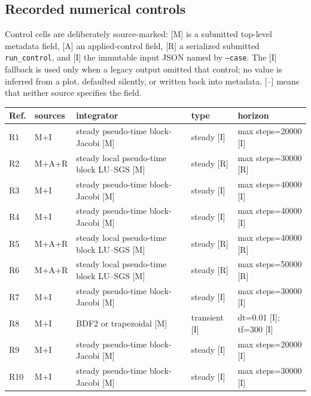 \subsection{Recorded numerical controls}
Control cells are deliberately source-marked: [M] is a submitted top-level metadata field, [A] an applied-control field, [R] a serialized submitted \texttt{run\_control}, and [I] the immutable input JSON named by \texttt{--case}. The [I] fallback is used only when a legacy output omitted that control; no value is inferred from a plot, defaulted silently, or written back into metadata. [--] means that neither source specifies the field.
\begin{center}\small
\begin{tabular}{llp{4.0cm}lp{3.4cm}}
\toprule Ref. & sources & integrator & type & horizon\\
\midrule
R1 & M+I & steady pseudo-time block-Jacobi [M] & steady [I] & max steps=20000 [I]\\
R2 & M+A+R & steady local pseudo-time block LU--SGS [M] & steady [R] & max steps=30000 [R]\\
R3 & M+I & steady pseudo-time block-Jacobi [M] & steady [I] & max steps=40000 [I]\\
R4 & M+I & steady pseudo-time block-Jacobi [M] & steady [I] & max steps=40000 [I]\\
R5 & M+A+R & steady local pseudo-time block LU--SGS [M] & steady [R] & max steps=40000 [R]\\
R6 & M+A+R & steady local pseudo-time block LU--SGS [M] & steady [R] & max steps=50000 [R]\\
R7 & M+I & steady pseudo-time block-Jacobi [M] & steady [I] & max steps=30000 [I]\\
R8 & M+I & BDF2 or trapezoidal [M] & transient [I] & dt=0.01 [I]; tf=300 [I]\\
R9 & M+I & steady pseudo-time block-Jacobi [M] & steady [I] & max steps=20000 [I]\\
R10 & M+I & steady pseudo-time block-Jacobi [M] & steady [I] & max steps=30000 [I]\\
\bottomrule
\end{tabular}
\label{tab:controls}
\end{center}
